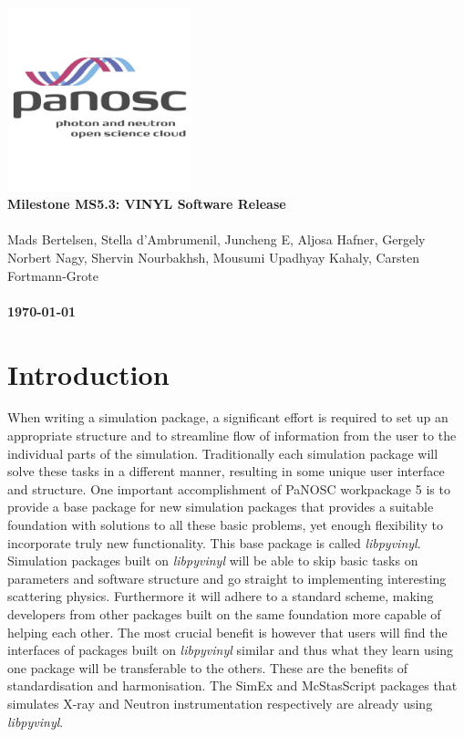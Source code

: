 \documentclass[10pt]{scrartcl}
\begin{document}
\makeatletter
\begin{titlepage}
\thispagestyle{scrheadings}
\ohead{}
\ihead{}
\chead{}
\ifoot{}
\ofoot{}
\noindent%
\includegraphics[width=0.4\textwidth]{figures/PaNOSClogo_web_RGB_512x512.jpg}\\
\Huge{%
\renewcommand{\baselinestretch}{2.0}%
  \textbf{%
    Milestone MS5.3: VINYL Software Release\\
  }%
}%
\\
{%
\Large{%
  Mads Bertelsen,
  Stella d'Ambrumenil,
  Juncheng E,
  Aljosa Hafner,
  Gergely Norbert Nagy,
  Shervin Nourbakhsh,
  Mousumi Upadhyay Kahaly,
  Carsten Fortmann-Grote
  \bigskip\\
  \bigskip\\
  \textbf{\today}%
}}%
\end{titlepage}
\makeatother

\section{Introduction}
When writing a
simulation package, a significant effort is required to set up an appropriate
structure and to streamline flow of information from the user to the individual
parts of the simulation. Traditionally each simulation package will solve these
tasks in a different manner, resulting in some unique user interface and
structure. One important accomplishment of PaNOSC workpackage 5 is to provide a
base package for new simulation packages that provides a suitable foundation
with solutions to all these basic problems, yet enough flexibility to
incorporate truly new functionality. This base package is called
\textit{libpyvinyl}. Simulation packages built on \textit{libpyvinyl} will be
able to skip basic tasks on parameters and software structure and go straight
to implementing interesting scattering physics. Furthermore it will adhere to a
standard scheme, making developers from other packages built on the same
foundation more capable of helping each other. The most crucial benefit is
however that users will find the interfaces of packages built on
\textit{libpyvinyl} similar and thus what they learn using one package will be
transferable to the others. These are the benefits of standardisation and
harmonisation. The SimEx and McStasScript packages that simulates X-ray and
Neutron instrumentation respectively are already using \textit{libpyvinyl}.
\end{document}
